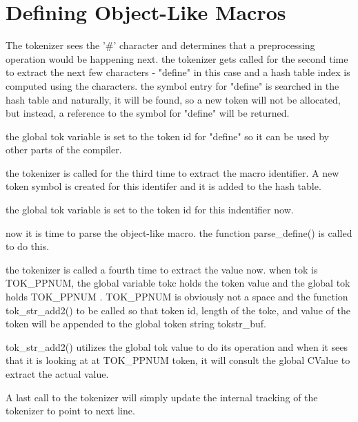 \section{Defining Object-Like Macros}

The tokenizer sees the '\#' character and determines that a preprocessing operation would be happening next. the tokenizer gets called for the second time to extract the next few characters - "define" in this case and a hash table
index is computed using the characters. the symbol entry for "define" is searched in the hash table and naturally, it will be found, so a new token will not be allocated, but instead, a reference to the symbol for "define" will be returned.

the global tok variable is set to the token id for "define" so it can be used by other parts of the compiler.

the tokenizer is called for the third time to extract the macro identifier. A new token symbol is created for this identifer and it is added to the hash table.

the global tok variable is set to the token id for this indentifier now.

now it is time to parse the object-like macro. the function parse\_define() is called to do this.

the tokenizer is called a fourth time to extract the value now. when tok is TOK\_PPNUM, the global variable tokc holds the token value and the global tok holds TOK\_PPNUM . TOK\_PPNUM is obviously not a space and the function tok\_str\_add2() to be called so that token id, length of the toke, and value of the token will be appended to the global token string tokstr\_buf.

tok\_str\_add2() utilizes the global tok value to do its operation and when it sees that it is looking at at TOK\_PPNUM token, it will consult the global CValue to extract the actual value.

A last call to the tokenizer will simply update the internal tracking of the tokenizer to point to next line.







